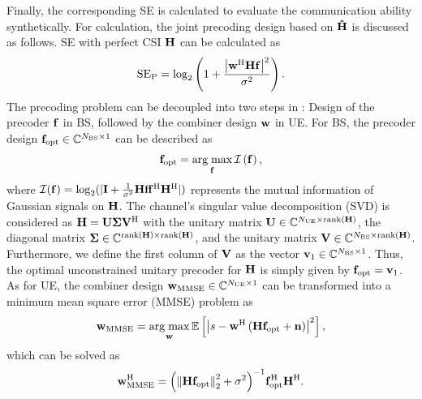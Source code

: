\documentclass[journal,12pt,onecolumn,draftclsnofoot,]{IEEEtran}
\begin{document}
Finally, the corresponding SE is calculated to evaluate the communication ability synthetically. For calculation, the joint precoding design based on ${{\bf{\hat H}}}$ is discussed as follows. 
SE with perfect CSI $\bf H$ can be calculated as \cite{a1601}
\begin{equation}
\label{34}
{\rm{S}}{{\rm{E}}_{\rm{P}}} = {\log _2}\left({ {1} + \frac{{\left|{{\bf{w}}^{\rm H}{\bf{H}}{{\bf{f}}}} \right|}^2 }{{\sigma ^2}} } \right).
\end{equation}
\noindent The precoding problem can be decoupled into two steps in \cite{a17}: Design of the precoder ${{\bf{f}}}$ in BS, followed by the combiner design ${{\bf{w}}}$ in UE. For BS, the precoder design ${{{\bf{ f}}}_{{\rm{opt}}}}\in \mathbb{C}^{{N_{{\rm{BS}}}} \times {1}}$ can be described as
\begin{equation}
{{{\bf{ f}}}_{{\rm{opt}}}} = \mathop {{\rm{arg\;max}}}\limits_{{{\bf{f}}}} {\cal I}\left({{{\bf{f}}}} \right),
\end{equation}
\noindent where ${\cal I}({{{\bf{f}}}} ) = {\log _2}({| {{\bf{I}} + \frac{{\rm{1 }}}{{{{\rm{\sigma }}^2}}}{\bf{H}}{{\bf{f}}}{\bf{f}}^{\rm H}{{\bf{H}}^{\rm H}}} |} )$ represents the mutual information of Gaussian signals on $\bf{H}$. 
The channel’s singular value decomposition (SVD) is considered as ${\bf{H = U\Sigma }}{{\bf{V}}^{\rm H}}$ with the unitary matrix ${\bf{U}} \in \mathbb{C}^{{N_{{\rm{UE}}}} \times {\rm{rank}}({\bf{H}} )}$, 
the diagonal matrix ${\bf{\Sigma }} \in \mathbb{C}^{{\rm{rank}}({\bf{H}} ) \times {\rm{rank}}({\bf{H}} )}$, 
and the unitary matrix ${\bf{V}} \in \mathbb{C}^{{N_{{\rm{BS}}}} \times {\rm{rank}}({\bf{H}} )}$. 
Furthermore, we define the first column of $\bf{V}$ as the vector ${{\bf{v}}_1}\in \mathbb{C}^{{N_{{\rm{BS}}}} \times {1}}$. 
Thus, the optimal unconstrained unitary precoder for $\bf{H}$ is simply given by ${{{\bf{ f}}}_{{\rm{opt}}}} = {{{\bf{ v}}}_1}$.
As for UE, the combiner design ${{\bf{w}}_{{\rm{MMSE}}}}\in \mathbb{C}^{{N_{{\rm{UE}}}} \times {1}}$ can be transformed into a minimum mean square error (MMSE) problem as
\begin{equation}
{{\bf{w}}_{{\rm{MMSE}}}} = \mathop {{\rm{arg\;max}}}\limits_{{{\bf{w}}}} 
\mathbb{E}
\left[{
{\left| { {{{s}} - {\bf{w}}^{\rm H}\left({{\bf{H}}{{{\bf{ f}}}_{{\rm{opt}}}}+{\bf n}}\right)} } \right|}^2
}\right]
,
\end{equation}
which can be solved as
\begin{equation}
\label{37}
{\bf{w}}_{{\rm{MMSE}}}^{\rm H} = 
{\left({\left\| \bf{H}{{\bf{f}}_{{\rm{opt}}}}\right\|_2^2 + {{{\rm{\sigma }}^2}}} \right)^{ - 1}}{\bf{f}}_{{\rm{opt}}}^{\rm H}{{\bf{H}}^{\rm H}}.
\end{equation}
\end{document}
